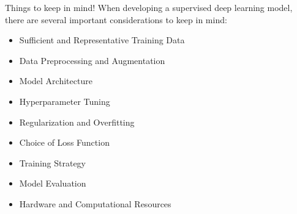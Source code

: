 \documentclass[10pt,aspectratio=169,dvipsnames]{beamer} %
\begin{document}
	\begin{frame}{Things to keep in mind!}
		When developing a supervised deep learning model, there are several important considerations to keep in mind:
		\begin{itemize}
			\item Sufficient and Representative Training Data
			\item Data Preprocessing and Augmentation
			\item Model Architecture
			\item Hyperparameter Tuning
			\item Regularization and Overfitting
			\item Choice of Loss Function
			\item Training Strategy
			\item Model Evaluation
			\item Hardware and Computational Resources	
		\end{itemize}
	\end{frame}
\end{document}
